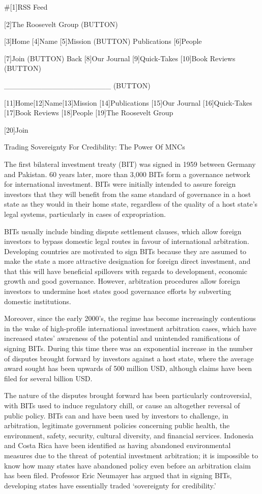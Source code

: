   #[1]RSS Feed

   [2]The Roosevelt Group
   (BUTTON)

   [3]Home [4]Name [5]Mission (BUTTON) Publications [6]People

   [7]Join
   (BUTTON) Back [8]Our Journal [9]Quick-Takes [10]Book Reviews
   (BUTTON)

   ____________________ (BUTTON)

   [11]Home[12]Name[13]Mission [14]Publications [15]Our Journal
   [16]Quick-Takes [17]Book Reviews [18]People
   [19]The Roosevelt Group

   [20]Join

Trading Sovereignty For Credibility: The Power Of MNCs


   The first bilateral investment treaty (BIT) was signed in 1959 between
   Germany and Pakistan. 60 years later, more than 3,000 BITs form a
   governance network for international investment. BITs were initially
   intended to assure foreign investors that they will benefit from the
   same standard of governance in a host state as they would in their home
   state, regardless of the quality of a host state's legal systems,
   particularly in cases of expropriation.

   BITs usually include binding dispute settlement clauses, which allow
   foreign investors to bypass domestic legal routes in favour of
   international arbitration. Developing countries are motivated to sign
   BITs because they are assumed to make the state a more attractive
   designation for foreign direct investment, and that this will have
   beneficial spillovers with regards to development, economic growth and
   good governance. However, arbitration procedures allow foreign
   investors to undermine host states good governance efforts by
   subverting domestic institutions.

   Moreover, since the early 2000's, the regime has become increasingly
   contentious in the wake of high-profile international investment
   arbitration cases, which have increased states' awareness of the
   potential and unintended ramifications of signing BITs. During this
   time there was an exponential increase in the number of disputes
   brought forward by investors against a host state, where the average
   award sought has been upwards of 500 million USD, although claims have
   been filed for several billion USD.

   The nature of the disputes brought forward has been particularly
   controversial, with BITs used to induce regulatory chill, or cause an
   altogether reversal of public policy. BITs can and have been used by
   investors to challenge, in arbitration, legitimate government policies
   concerning public health, the environment, safety, security, cultural
   diversity, and financial services. Indonesia and Costa Rica have been
   identified as having abandoned environmental measures due to the threat
   of potential investment arbitration; it is impossible to know how many
   states have abandoned policy even before an arbitration claim has been
   filed. Professor Eric Neumayer has argued that in signing BITs,
   developing states have essentially traded `sovereignty for
   credibility.'

